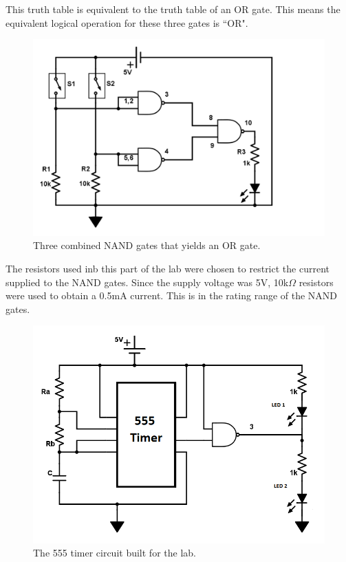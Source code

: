 \documentclass[twocolumn, amsmath]{revtex4}
\begin{document}
This truth table is equivalent to the truth table of an OR gate. This means the equivalent logical operation for these three gates is ``OR".


\begin{figure}[h]
    \includegraphics[scale=0.25]{NAND.png}  
    \caption{Three combined NAND gates that yields an OR gate.}
\end{figure}


The resistors used inb this part of the lab were chosen to restrict the current supplied to the NAND gates. Since the supply voltage was 5V, 10k$\Omega$ resistors were used to obtain a 0.5mA current. This is in the rating range of the NAND gates. %




\begin{figure}[h]
    \includegraphics[scale=0.35]{555.png}  
    \caption{The 555 timer circuit built for the lab.}
\end{figure}
\end{document}
